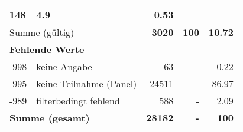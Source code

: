 \begin{longtable}{lXrrr}
       \num{148} &
       \num[round-mode=places,round-precision=2]{4,9} &
         \num[round-mode=places,round-precision=2]{0,53} \\
     \midrule
     \multicolumn{2}{l}{Summe (gültig)} &
       \textbf{\num{3020}} &
     \textbf{100} &
       \textbf{\num[round-mode=places,round-precision=2]{10,72}} \\
     \multicolumn{5}{l}{\textbf{Fehlende Werte}}\\
       -998 &
       keine Angabe &
         \num{63} &
        - &
         \num[round-mode=places,round-precision=2]{0,22} \\
       -995 &
       keine Teilnahme (Panel) &
         \num{24511} &
        - &
         \num[round-mode=places,round-precision=2]{86,97} \\
       -989 &
       filterbedingt fehlend &
         \num{588} &
        - &
         \num[round-mode=places,round-precision=2]{2,09} \\
     \midrule
     \multicolumn{2}{l}{\textbf{Summe (gesamt)}} &
          \textbf{\num{28182}} &
        \textbf{-} &
        \textbf{100} \\
     \bottomrule
     \end{longtable}
     
